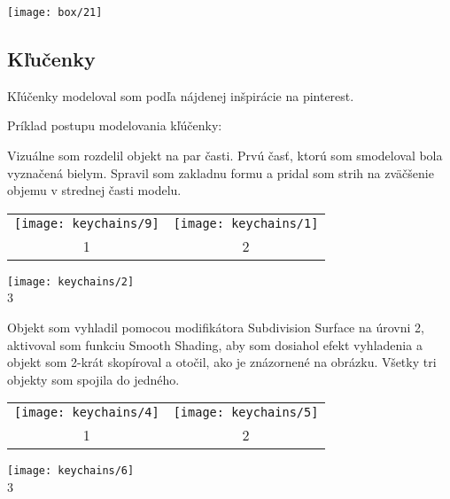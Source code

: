         \begin{center}
          \texttt{[image: box/21]}
        \end{center}
      \subsection{Kľučenky}

        Kľúčenky modeloval som podľa nájdenej inšpirácie na pinterest.

        Príklad postupu modelovania kľúčenky:

        Vizuálne som rozdelil objekt na par časti. Prvú časť, ktorú som smodeloval bola vyznačená bielym. Spravil som zakladnu formu a pridal som strih na zväčšenie objemu v strednej časti modelu. \\

        \begin{tabular}{c c}
          \texttt{[image: keychains/9]} & \texttt{[image: keychains/1]} \\
          1 & 2 \\
        \end{tabular}

        \begin{center}
          \texttt{[image: keychains/2]} \\
          3
        \end{center}

        Objekt som vyhladil pomocou modifikátora Subdivision Surface na úrovni 2, aktivoval som funkciu Smooth Shading, aby som dosiahol efekt vyhladenia a objekt som 2-krát skopíroval a otočil, ako je znázornené na obrázku. Všetky tri objekty som spojila do jedného. \\
        \begin{center}
          \begin{tabular}{c c}
            \texttt{[image: keychains/4]} & \texttt{[image: keychains/5]} \\
            1 & 2 \\
          \end{tabular}
        \end{center}

        \begin{center}
          \texttt{[image: keychains/6]} \\
          3
        \end{center}

